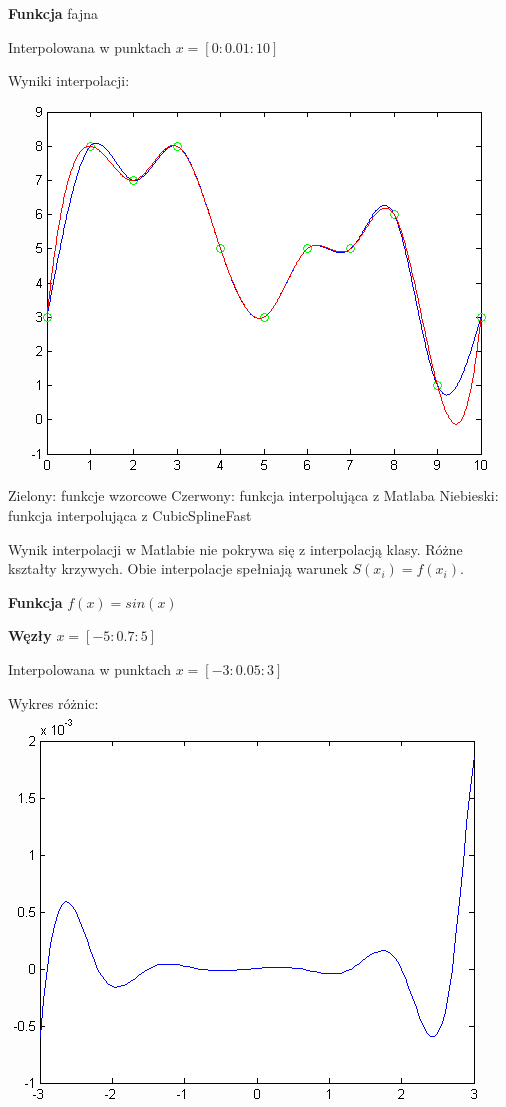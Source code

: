 \documentclass[a4paper,11pt,notitlepage]{article}
\begin{document}
\vspace{1cm}

\textbf{Funkcja} fajna


Interpolowana w punktach $x = [0:0.01:10]$

Wyniki interpolacji:\\
\includegraphics{spline2.png}
Zielony: funkcje wzorcowe
Czerwony: funkcja interpolująca z Matlaba
Niebieski: funkcja interpolująca z CubicSplineFast

Wynik interpolacji w Matlabie nie pokrywa się z interpolacją klasy. Różne kształty krzywych. Obie interpolacje spełniają warunek $S(x_i) = f(x_i)$.

\vspace{1cm}

\textbf{Funkcja} $f(x) = sin(x)$

\textbf{Węzły} $x = [-5:0.7:5]$

Interpolowana w punktach $x = [-3:0.05:3]$

Wykres różnic:\\
\includegraphics{spline3.png}
\end{document}
